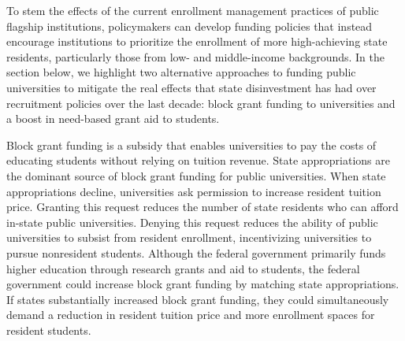 \documentclass{article}
\begin{document}


To stem the effects of the current enrollment management practices of public flagship institutions, policymakers can develop funding policies that instead encourage institutions to prioritize the enrollment of more high-achieving state residents, particularly those from low- and middle-income backgrounds. In the section below, we highlight two alternative approaches to funding public universities to mitigate the real effects that state disinvestment has had over recruitment policies over the last decade: block grant funding to universities and a boost in need-based grant aid to students.

Block grant funding is a subsidy that enables universities to pay the costs of educating students without relying on tuition revenue. State appropriations are the dominant source of block grant funding for public universities. When state appropriations decline, universities ask permission to increase resident tuition price. Granting this request reduces the number of state residents who can afford in-state public universities. Denying this request reduces the ability of public universities to subsist from resident enrollment, incentivizing universities to pursue nonresident students. Although the federal government primarily funds higher education through research grants and aid to students, the federal government could increase block grant funding by matching state appropriations.  If states substantially increased block grant funding, they could simultaneously demand a reduction in resident tuition price and more enrollment spaces for resident students.
\end{document}
